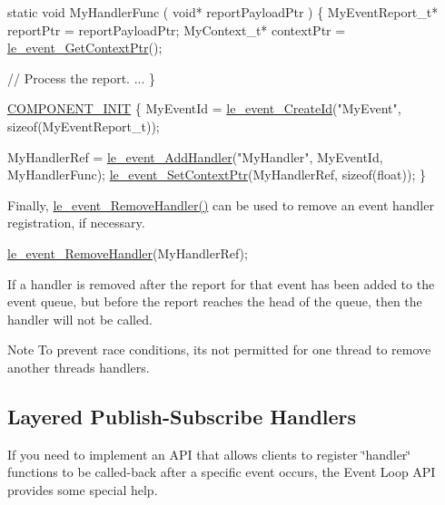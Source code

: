 \begin{DoxyCode}
\textcolor{keyword}{static} \textcolor{keywordtype}{void} MyHandlerFunc
(
    \textcolor{keywordtype}{void}* reportPayloadPtr
)
\{
    MyEventReport\_t* reportPtr = reportPayloadPtr;
    MyContext\_t* contextPtr = \hyperlink{le__event_loop_8h_a1c73916295cc9e17af07e02756aa86c9}{le\_event\_GetContextPtr}();

    \textcolor{comment}{// Process the report.}
    ...
\}

\hyperlink{le__event_loop_8h_abdb9187a56836a93d19cc793cbd4b7ec}{COMPONENT\_INIT}
\{
    MyEventId = \hyperlink{le__event_loop_8h_a41a96eb3affb07184b519164cf54e213}{le\_event\_CreateId}(\textcolor{stringliteral}{"MyEvent"}, \textcolor{keyword}{sizeof}(MyEventReport\_t));

    MyHandlerRef = \hyperlink{le__event_loop_8h_ae65a65b4111618f47d7e6d57a48289e5}{le\_event\_AddHandler}(\textcolor{stringliteral}{"MyHandler"}, MyEventId, MyHandlerFunc);
    \hyperlink{le__event_loop_8h_ae0c4307a9715794c720e525032aa0bfd}{le\_event\_SetContextPtr}(MyHandlerRef, \textcolor{keyword}{sizeof}(\textcolor{keywordtype}{float}));
\}
\end{DoxyCode}


Finally, \hyperlink{le__event_loop_8h_ae31a85d4acbef72451b5411a613eea58}{le\+\_\+event\+\_\+\+Remove\+Handler()} can be used to remove an event handler registration, if necessary.


\begin{DoxyCode}
\hyperlink{le__event_loop_8h_ae31a85d4acbef72451b5411a613eea58}{le\_event\_RemoveHandler}(MyHandlerRef);
\end{DoxyCode}


If a handler is removed after the report for that event has been added to the event queue, but before the report reaches the head of the queue, then the handler will not be called.

\begin{DoxyNote}{Note}
To prevent race conditions, it\textquotesingle{}s not permitted for one thread to remove another thread\textquotesingle{}s handlers.
\end{DoxyNote}
\hypertarget{c_event_loop_c_event_layeredPublishSubscribe}{}\subsection{Layered Publish-\/\+Subscribe Handlers}\label{c_event_loop_c_event_layeredPublishSubscribe}
If you need to implement an A\+P\+I that allows clients to register \char`\"{}handler\char`\"{} functions to be called-\/back after a specific event occurs, the Event Loop A\+P\+I provides some special help.

